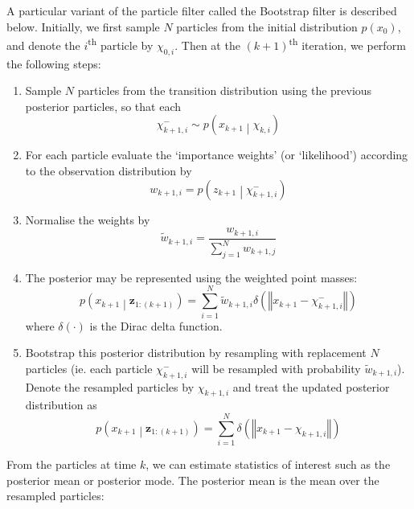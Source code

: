 \documentclass[11pt]{report} %
\begin{document}
A particular variant of the particle filter called the Bootstrap filter is described below. Initially, we first sample $N$ particles from the initial distribution $p\left(x_{0}\right)$, and denote the $i$\textsuperscript{th} particle by $\chi_{0, i}$. Then at the $\left(k + 1\right)$\textsuperscript{th} iteration, we perform the following steps:
\begin{enumerate}
\item Sample $N$ particles from the transition distribution using the previous posterior particles, so that each
\begin{equation}
\chi_{k + 1, i}^{-} \sim p\left(x_{k + 1}\middle| \chi_{k, i}\right)
\end{equation}
\item For each particle evaluate the `importance weights' (or `likelihood') according to the observation distribution by
\begin{equation}
w_{k + 1, i} = p\left(z_{k + 1}\middle| \chi_{k + 1, i}^{-}\right)
\end{equation}
\item Normalise the weights by
\begin{equation}
\widetilde{w}_{k + 1, i} = \dfrac{w_{k + 1, i} }{\sum_{j = 1}^{N}w_{k + 1, j}}
\end{equation}
\item The posterior may be represented using the weighted point masses:
\begin{equation}
p\left(x_{k + 1}\middle| \mathbf{z}_{1:\left(k + 1\right)}\right) = \sum_{i = 1}^{N}\widetilde{w}_{k + 1, i}\delta\left(\left\Vert x_{k + 1} - \chi_{k + 1, i}^{-}\right\Vert\right)
\end{equation}
where $\delta\left(\cdot\right)$ is the Dirac delta function.
\item Bootstrap this posterior distribution by resampling with replacement $N$ particles (ie. each particle $\chi_{k + 1, i}^{-}$ will be resampled with probability $\widetilde{w}_{k + 1, i}$). Denote the resampled particles by $\chi_{k + 1, i}$ and treat the updated posterior distribution as 
\begin{equation}
p\left(x_{k + 1}\middle| \mathbf{z}_{1:\left(k + 1\right)}\right) = \sum_{i = 1}^{N}\delta\left(\left\Vert x_{k + 1} - \chi_{k + 1, i}\right\Vert\right)
\end{equation}
\end{enumerate}
From the particles at time $k$, we can estimate statistics of interest such as the posterior mean or posterior mode. The posterior mean is the mean over the resampled particles:
\end{document}

